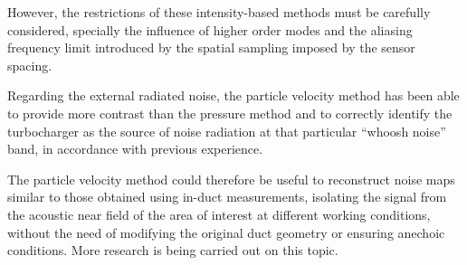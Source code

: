 However, the restrictions of these intensity-based methods must be carefully considered, specially the influence of higher order modes and the aliasing frequency limit introduced by the spatial sampling imposed by the sensor spacing.

Regarding the external radiated noise, the particle velocity method has been able to provide more contrast than the pressure method and to correctly identify the turbocharger as the source of noise radiation at that particular ``whoosh noise'' band, in accordance with previous experience.

The particle velocity method could therefore be useful to reconstruct noise maps similar to those obtained using in-duct measurements, isolating the signal from the acoustic near field of the area of interest at different working conditions, without the need of modifying the original duct geometry or ensuring anechoic conditions. More research is being carried out on this topic.
